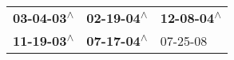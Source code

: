 \begin{supertabular}{lll}
 \textbf{03-04-03\textsuperscript{$\wedge$}} &  \textbf{02-19-04\textsuperscript{$\wedge$}} &  \textbf{12-08-04\textsuperscript{$\wedge$}} \\
 \textbf{11-19-03\textsuperscript{$\wedge$}} &  \textbf{07-17-04\textsuperscript{$\wedge$}} &                   07-25-08\textsuperscript{} \\
\end{supertabular}
